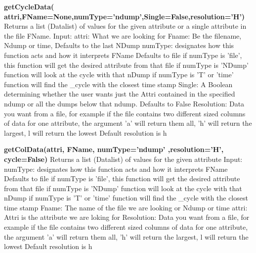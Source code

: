 {\bf getCycleData( attri,FName=None,numType='ndump',Single=False,resolution='H')}
\newline 
Returns a list (Datalist) of values for the given attribute or a single attribute in the file FName.
\newline
		Input:\newline
		attri: What we are looking for\newline
		Fname: Be the filename, Ndump or time, Defaults to the last NDump\newline
		numType: designates how this function acts and how it interprets FName
			 Defaults to file\newline
		if numType is 'file', this function will get the desired attribute from that file\newline
		if numType is 'NDump' function will look at the cycle with that nDump\newline
		if numType is 'T' or 'time' function will find the \_cycle with the closest time stamp \newline
		Single: A Boolean determining whether the user wants just the Attri contained
		        in the specified ndump or all the dumps below that ndump. 
		        Defaults to False\newline
		Resolution: Data you want from a file, for example if the file 
			    contains two different sized columns of data for one attribute, 
			    the argument 'a' will return them all, 'h' will return the largest, 
			    l will return the lowest
			    Default resolution is h\newline
			    
			    
{\bf getColData(attri, FName, numType='ndump' ,resolution='H', cycle=False)}
\newline 
Returns a list (Datalist) of values for the given attribute 
\newline
		Input: \newline
		numType: designates how this function acts and how it interprets FName
			 Defaults to file\newline
		if numType is 'file', this function will get the desired attribute from that file\newline
		if numType is 'NDump' function will look at the cycle with that nDump\newline
		if numType is 'T' or 'time' function will find the \_cycle with the closest time stamp \newline
		Fname: The name of the file we are looking or Ndump or time\newline
		attri: Attri is the attribute we are loking for\newline
		Resolution: Data you want from a file, for example if the file 
			    contains two different sized columns of data for one attribute, 
			    the argument 'a' will return them all, 'h' will return the largest, 
			    l will return the lowest
			    Default resolution is h\newline
		
